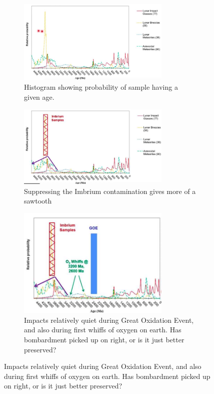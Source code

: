 \documentclass[]{article}
\begin{document}
\begin{figure}[H]
	\caption{Lunar Flux as a function of Age}\label{fig:LunarFlux}
	\begin{subfigure}[t]{0.30\textwidth}
		\caption{Histogram showing probability of sample having a given age.}
		\includegraphics[width=0.8\textwidth]{LunarFlux0}
	\end{subfigure}
\;
	\begin{subfigure}[t]{0.30\textwidth}
		\caption{Suppressing the Imbrium contamination gives more of a sawtooth}
		\includegraphics[width=0.8\textwidth]{LunarFluxWithoutImbrium}
	\end{subfigure}
\;
	\begin{subfigure}[t]{0.30\textwidth}
		\caption{Impacts relatively quiet during Great Oxidation Event, and also during first whiffs of oxygen on earth. Has bombardment picked up on right, or is it just better preserved?}
		\includegraphics[width=0.8\textwidth]{LunarGOE}
	\end{subfigure}
\end{figure}
\end{document}
